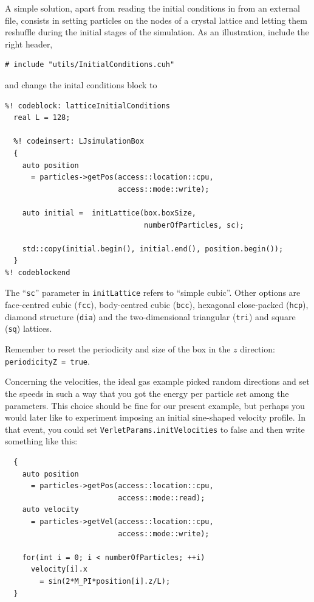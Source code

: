 A simple solution, apart from reading the initial conditions in from an external 
file, consists in setting particles on the nodes of a crystal lattice and 
letting them reshuffle during the initial stages of the simulation. As an
illustration, include the right header,
\begin{lstlisting}
# include "utils/InitialConditions.cuh"
\end{lstlisting}
and change the inital conditions block to
\begin{lstlisting}
%! codeblock: latticeInitialConditions
  real L = 128;

  %! codeinsert: LJsimulationBox
  {
    auto position
      = particles->getPos(access::location::cpu,
                          access::mode::write);

    auto initial =  initLattice(box.boxSize,
                                numberOfParticles, sc);

    std::copy(initial.begin(), initial.end(), position.begin());
  }
%! codeblockend
\end{lstlisting}
The ``\texttt{sc}'' parameter in \texttt{initLattice} refers to ``simple
cubic''. Other options are face-centred cubic (\texttt{fcc}), body-centred cubic
(\texttt{bcc}), hexagonal close-packed (\texttt{hcp}), diamond structure
(\texttt{dia}) and the two-dimensional triangular (\texttt{tri}) and square
(\texttt{sq}) lattices.

Remember to reset the periodicity and size of the box in the $z$ direction:
\texttt{periodicityZ = true}.

Concerning the velocities, the ideal gas example picked random directions and set
the speeds in such a way that you got the energy per particle set among the
parameters. This choice should be fine for our present example, but perhaps you
would later like to experiment imposing an initial sine-shaped velocity profile.
In that event, you could set \texttt{VerletParams.initVelocities} to false and
then write something like this:
\begin{lstlisting}
  {
    auto position
      = particles->getPos(access::location::cpu,
                          access::mode::read);
    auto velocity
      = particles->getVel(access::location::cpu,
                          access::mode::write);

    for(int i = 0; i < numberOfParticles; ++i)
      velocity[i].x
        = sin(2*M_PI*position[i].z/L);
  }
\end{lstlisting}

